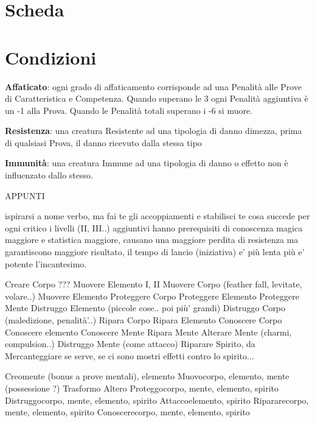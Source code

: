 \documentclass[12pt,a4paper,twoside,openany]{book}
\begin{document}
\pagebreak

\section{Scheda}

\pagebreak

\section{Condizioni}

\textbf{Affaticato}: ogni grado di affaticamento corrisponde ad una Penalità alle Prove di Caratteristica e Competenza. Quando superano le 3 ogni Penalità aggiuntiva è un -1 alla Prova.
Quando le Penalità totali superano i -6 si muore.


\textbf{Resistenza}: una creatura Resistente ad una tipologia di danno dimezza, prima di qualsiasi Prova, il danno ricevuto dalla stessa tipo 

\textbf{Immunità}: una creatura Immune ad una tipologia di danno o effetto non è influenzato dallo stesso.

\pagebreak
\pagebreak


APPUNTI
\pagebreak
\pagebreak



ispirarsi a nome verbo, ma fai te gli accoppiamenti e stabilisci te cosa succede per ogni critico 
i livelli (II, III..) aggiuntivi hanno prerequisiti di conoscenza magica maggiore e statistica maggiore, causano una maggiore perdita di resistenza ma garantiscono maggiore risultato, il tempo di lancio (iniziativa) e' più lenta più e' potente l'incantesimo.

Creare Corpo  ???
Muovere Elemento I, II
Muovere Corpo (feather fall, levitate, volare..)
Muovere Elemento
Proteggere Corpo
Proteggere Elemento 
Proteggere Mente
Distruggo Elemento (piccole cose.. poi più' grandi)
Distruggo Corpo (maledizione, penalità'..)
Ripara Corpo
Ripara Elemento
Conoscere Corpo
Conoscere elemento
Conoscere Mente
Ripara Mente
Alterare Mente (charmi, compulsion..)
Distruggo Mente (come attacco)
Riparare Spirito, da Mercanteggiare se serve, se ci sono mostri effetti contro lo spirito...


Creomente (bonus a prove mentali), elemento
Muovocorpo, elemento, mente (possessione ?)
Trasformo
Altero
Proteggocorpo, mente, elemento, spirito
Distruggocorpo, mente, elemento, spirito
Attaccoelemento, spirito
Ripararecorpo, mente, elemento, spirito
Conoscerecorpo, mente, elemento, spirito
\end{document}
